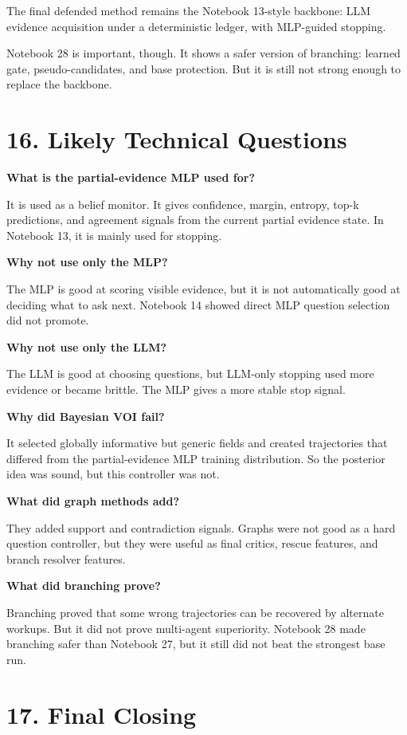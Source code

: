 \documentclass[11pt]{article}
\begin{document}
The final defended method remains the Notebook 13-style backbone: LLM evidence acquisition under a deterministic ledger, with MLP-guided stopping.

Notebook 28 is important, though. It shows a safer version of branching: learned gate, pseudo-candidates, and base protection. But it is still not strong enough to replace the backbone.

\section*{16. Likely Technical Questions}

\textbf{What is the partial-evidence MLP used for?}

It is used as a belief monitor. It gives confidence, margin, entropy, top-k predictions, and agreement signals from the current partial evidence state. In Notebook 13, it is mainly used for stopping.

\textbf{Why not use only the MLP?}

The MLP is good at scoring visible evidence, but it is not automatically good at deciding what to ask next. Notebook 14 showed direct MLP question selection did not promote.

\textbf{Why not use only the LLM?}

The LLM is good at choosing questions, but LLM-only stopping used more evidence or became brittle. The MLP gives a more stable stop signal.

\textbf{Why did Bayesian VOI fail?}

It selected globally informative but generic fields and created trajectories that differed from the partial-evidence MLP training distribution. So the posterior idea was sound, but this controller was not.

\textbf{What did graph methods add?}

They added support and contradiction signals. Graphs were not good as a hard question controller, but they were useful as final critics, rescue features, and branch resolver features.

\textbf{What did branching prove?}

Branching proved that some wrong trajectories can be recovered by alternate workups. But it did not prove multi-agent superiority. Notebook 28 made branching safer than Notebook 27, but it still did not beat the strongest base run.

\section*{17. Final Closing}
\end{document}
